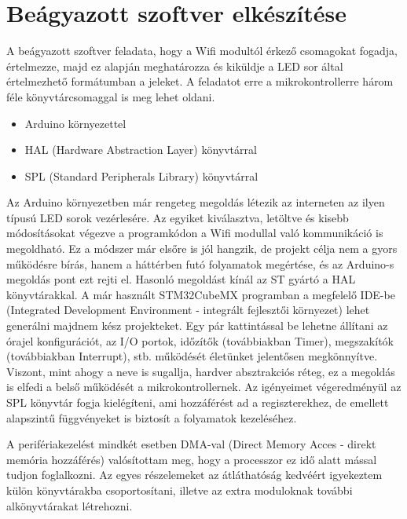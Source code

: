 \documentclass[../main.tex]{subfiles}
\begin{document}
\section{Beágyazott szoftver elkészítése}
        A beágyazott szoftver feladata, hogy a Wifi modultól érkező csomagokat fogadja, értelmezze, majd ez alapján meghatározza és kiküldje a LED sor által értelmezhető formátumban a jeleket. A feladatot erre a mikrokontrollerre három féle könyvtárcsomaggal is meg lehet oldani. 
        
        \begin{itemize}
            \item Arduino környezettel
            \item HAL (Hardware Abstraction Layer) könyvtárral
            \item SPL (Standard Peripherals Library) könyvtárral
        \end{itemize}
        
        Az Arduino környezetben már rengeteg megoldás létezik az interneten az ilyen típusú LED sorok vezérlesére. Az egyiket kiválasztva, letöltve és kisebb módosításokat végezve a programkódon a Wifi modullal való kommunikáció is megoldható. Ez a módszer már elsőre is jól hangzik, de projekt célja nem a gyors működésre bírás, hanem a háttérben futó folyamatok megértése, és az Arduino-s megoldás pont ezt rejti el. Hasonló megoldást kínál az ST gyártó a HAL könyvtárakkal. A már használt STM32CubeMX programban a megfelelő IDE-be (Integrated Development Environment - integrált fejlesztői környezet) lehet generálni majdnem kész projekteket. Egy pár kattintással be lehetne állítani az órajel konfigurációt, az I/O portok, időzítők (továbbiakban Timer), megszakítók (továbbiakban Interrupt), stb. működését életünket jelentősen megkönnyítve. Viszont, mint ahogy a neve is sugallja, hardver absztrakciós réteg, ez a megoldás is elfedi a belső működését a mikrokontrollernek. Az igényeimet végeredményül az SPL könyvtár fogja kielégíteni, ami hozzáférést ad a regiszterekhez, de emellett alapszintű függvényeket is biztosít a folyamatok kezeléséhez. \cite{hal_spl1}\cite{hal_spl2}
        
        A perifériakezelést mindkét esetben DMA-val (Direct Memory Acces - direkt memória hozzáférés) valósítottam meg, hogy a processzor ez idő alatt mással tudjon foglalkozni. Az egyes részelemeket az átláthatóság kedvéért igyekeztem külön könyvtárakba csoportosítani, illetve az extra moduloknak további alkönyvtárakat létrehozni. 
        
\end{document}
